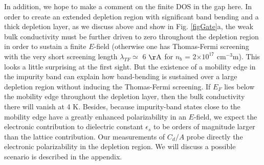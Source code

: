 In addition, we hope to make a comment on the finite DOS in the gap here.
In order to create an extended depletion region with significant band bending and a thick depletion layer, as we discuss above and show in Fig. \ref{figGate}a, 
the weak bulk conductivity must be further driven to zero throughout the depletion region
in order to sustain a finite $E$-field (otherwise one has Thomas-Fermi screening with the very short screening length 
$\lambda_{TF} \simeq$ 6 $\rm\AA$
for $n_b$ = 2$\times 10^{17}$ cm$^{-3}$m). This looks a little surprising at the first sight. But the existence of a mobility edge in the 
impurity band can explain how band-bending is sustained over a large depletion region without inducing the Thomas-Fermi screening. If $E_F$ lies below the mobility edge throughout the depletion layer,  then the bulk conductivity there will vanish at 4 K. Besides, because impurity-band states close to the mobility edge have a greatly enhanced polarizability in an $E$-field, we expect the electronic contribution to 
dielectric constant $\epsilon_s$ to be orders of magnitude larger than the lattice contribution. Our measurements of $C_d/A$ probe directly the electronic polarizability in the depletion region. We will discuss a possible scenario is described in the appendix.

